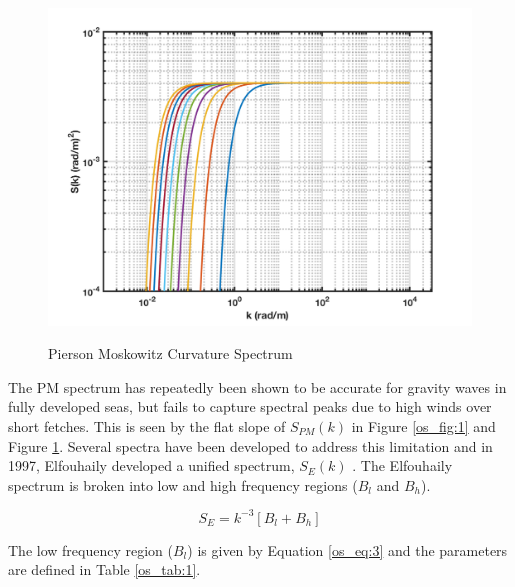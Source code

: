 \begin{figure}[H]
  \begin{center}
\includegraphics[width=5in]{../media/PM_curvature_spectrum.png}
  \end{center}
  \renewcommand{\baselinestretch}{1} \small\normalsize
  \begin{quote}
    \caption[Pierson Moskowitz Curvature Spectrum]{Pierson Moskowitz Curvature Spectrum\label{os_fig:2}}
  \end{quote}
\end{figure}
\renewcommand{\baselinestretch}{2} \small\normalsize

The PM spectrum has repeatedly been shown to be accurate for gravity waves in fully developed seas, but fails to capture spectral peaks due to high winds over short fetches. This is seen by the flat slope of $S_{PM}(k)$ in Figure \ref{os_fig:1} and Figure \ref{os_fig:2}. Several spectra have been developed to address this limitation and in 1997, Elfouhaily developed a unified spectrum, $S_E(k)$ \cite{elfouhaily}. The Elfouhaily spectrum is broken into low and high frequency regions ($B_l$ and $B_h$).

\begin{equation}
  \label{os_eq:2}
  S_E = k^{-3}\left[B_l + B_h \right]
\end{equation}
\renewcommand{\baselinestretch}{2} \small\normalsize

The low frequency region ($B_l$) is given by Equation \ref{os_eq:3} and the parameters are defined in Table \ref{os_tab:1}.

